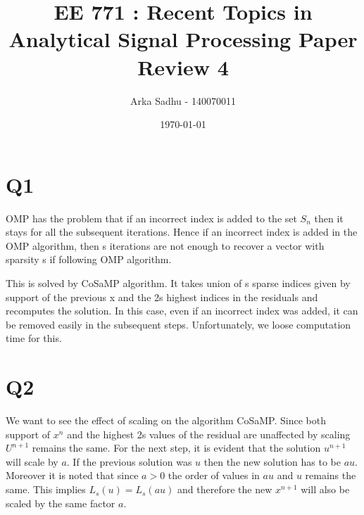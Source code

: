 \documentclass{article}
\title{EE 771 : Recent Topics in Analytical Signal Processing Paper Review 4}
\author{Arka Sadhu - 140070011}
\date{\today}
\begin{document}
\maketitle

\section{Q1}
OMP has the problem that if an incorrect index is added to the set $S_n$ then it stays for all the subsequent iterations. Hence if an incorrect index is added in the OMP algorithm, then s iterations are not enough to recover a vector with sparsity s if following OMP algorithm.

This is solved by CoSaMP algorithm. It takes union of s sparse indices given by support of the previous x and the 2s highest indices in the residuals and recomputes the solution. In this case, even if an incorrect index was added, it can be removed easily in the subsequent steps. Unfortunately, we loose computation time for this.

\section{Q2}
We want to see the effect of scaling on the algorithm CoSaMP.
Since both support of $x^n$ and the highest 2s values of the residual are unaffected by scaling $U^{n+1}$ remains the same. For the next step, it is evident that the solution $u^{n+1}$ will scale by $a$. If the previous solution was $u$ then the new solution has to be $au$. Moreover it is noted that since $a > 0$ the order of values in $au$ and $u$ remains the same. This implies $L_s(u) = L_s(au)$ and therefore the new $x^{n+1}$ will also be scaled by the same factor $a$.
\end{document}
